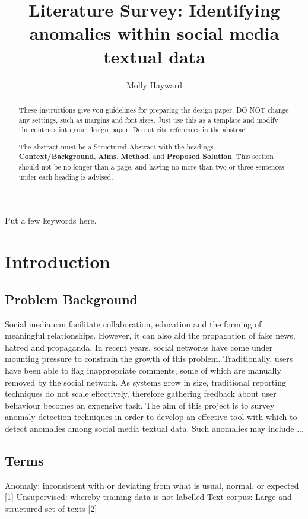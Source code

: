 \documentclass[12pt,a4paper]{article}
\title{Literature Survey: Identifying anomalies within social media textual data}
\author{Molly Hayward}
\date{}
\begin{document}
\maketitle

\begin{abstract}
These instructions give you guidelines for preparing the design paper.  DO NOT change any settings, such as margins and font sizes.  Just use this as a template and modify the contents into your design paper.  Do not cite references in the abstract.

The abstract must be a Structured Abstract with the headings {\bf Context/Background}, {\bf Aims}, {\bf Method}, and {\bf Proposed Solution}.  This section should not be no longer than a page, and having no more than two or three sentences under each heading is advised.
\end{abstract}

\begin{keywords}
Put a few keywords here.
\end{keywords}

\section{Introduction}

\subsection{Problem Background}
Social media can facilitate collaboration, education and the forming of meaningful relationships. However, it can also aid the propagation of fake news, hatred and propaganda. In recent years, social networks have come under mounting pressure to constrain the growth of this problem. Traditionally, users have been able to flag inappropriate comments, some of which are manually removed by the social network. As systems grow in size, traditional reporting techniques do not scale effectively, therefore gathering feedback about user behaviour becomes an expensive task.
The aim of this project is to survey anomaly detection techniques in order to develop an effective tool with which to detect anomalies among social media textual data. Such anomalies may include ...


\subsection{Terms}
Anomaly: inconsistent with or deviating from what is usual, normal, or expected [1]\newline
Unsupervised: whereby training data is not labelled\newline
Text corpus: Large and structured set of texts [2]\newline
\end{document}
